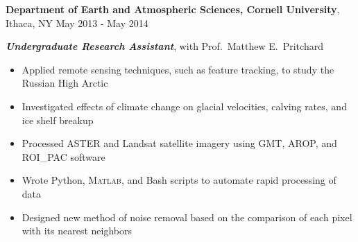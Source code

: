 
\textbf{Department of Earth and Atmospheric Sciences, Cornell University}, Ithaca, NY \hfill May 2013 - May 2014

\textbf{\textit{Undergraduate Research Assistant}}, with Prof.\ Matthew E.\ Pritchard

\begin{itemize}
    \item Applied remote sensing techniques, such as feature tracking, to study the Russian High Arctic
    \item Investigated effects of climate change on glacial velocities, calving rates, and ice shelf breakup
    \item Processed ASTER and Landsat satellite imagery using GMT, AROP, and ROI\_PAC software
    \item Wrote Python, \textsc{Matlab}, and Bash scripts to automate rapid processing of data
    \item Designed new method of noise removal based on the comparison of each pixel with its nearest neighbors
\end{itemize}
